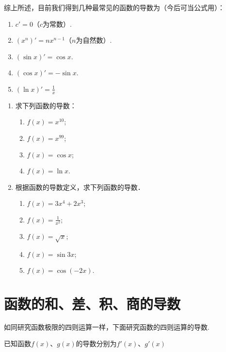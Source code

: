 综上所述，目前我们得到几种最常见的函数的导数为（今后可当公式用）：
\begin{thm}{}
   \begin{enumerate}
\item $c'=0$（$c$为常数）.
\item $(x^n)'=nx^{n-1}$（$n$为自然数）.
\item $(\sin x)'=\cos x$.
\item $(\cos x)'=-\sin x$.
\item $(\ln x)'=\frac{1}{x}$
\end{enumerate}     
\end{thm}

\begin{ex}
\begin{enumerate}
    \item 求下列函数的导数：
\begin{multicols}{2}
\begin{enumerate}[(1)]
\item $f(x)=x^{10}$;
\item $f(x)=x^{99}$;
\item $f(x)=\cos x$;
\item $f(x)=\ln x$.
\end{enumerate}
\end{multicols}
    \item 根据函数的导数定义，求下列函数的导数．
\begin{multicols}{2}
\begin{enumerate}[(1)]
\item $f(x)=3x^4+2x^3$;
\item $f(x)=\frac{1}{x^2}$;
\item $f(x)=\sqrt{x}$;
\item $f(x)=\sin3x$;
\item $f(x)=\cos(-2x)$.
\end{enumerate}
\end{multicols}
\end{enumerate}
\end{ex}

\section{函数的和、差、积、商的导数}
如同研究函数极限的四则运算一样，下面研究函数的四则运算的导数.

已知函数$f(x)$、$g(x)$的导数分别为$f'(x)$、$g'(x)$











